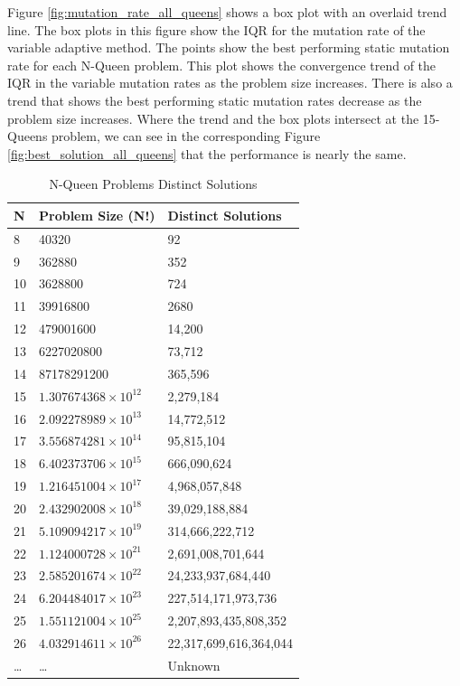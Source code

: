 \documentclass[conference]{IEEEtran}
\begin{document}
Figure \ref{fig:mutation_rate_all_queens} shows a box plot with an overlaid trend line. The box plots in this figure show the IQR for the mutation rate of the variable adaptive method. The points show the best performing static mutation rate for each N-Queen problem. This plot shows the convergence trend of the IQR in the variable mutation rates as the problem size increases. There is also a trend that shows the best performing static mutation rates decrease as the problem size increases. Where the trend and the box plots intersect at the 15-Queens problem, we can see in the corresponding Figure \ref{fig:best_solution_all_queens} that the performance is nearly the same.


% 
%
\begin{table}
\centering
\caption{N-Queen Problems Distinct Solutions}
\begin{tabular}{|l|l|l|} \hline
N  & Problem Size (N!)      & Distinct Solutions      \\ \hline
8  & 40320                      & 92                     \\
9  & 362880                     & 352                    \\
10 & 3628800                    & 724                    \\
11 & 39916800                   & 2680                   \\
12 & 479001600                  & 14,200                 \\
13 & 6227020800                 & 73,712                 \\
14 & 87178291200                & 365,596                \\
15 & $1.307674368\times10^{12}$ & 2,279,184              \\
16 & $2.092278989\times10^{13}$ & 14,772,512             \\
17 & $3.556874281\times10^{14}$ & 95,815,104             \\
18 & $6.402373706\times10^{15}$ & 666,090,624            \\
19 & $1.216451004\times10^{17}$ & 4,968,057,848          \\
20 & $2.432902008\times10^{18}$ & 39,029,188,884         \\
21 & $5.109094217\times10^{19}$ & 314,666,222,712        \\
22 & $1.124000728\times10^{21}$ & 2,691,008,701,644      \\
23 & $2.585201674\times10^{22}$ & 24,233,937,684,440     \\
24 & $6.204484017\times10^{23}$ & 227,514,171,973,736    \\
25 & $1.551121004\times10^{25}$ & 2,207,893,435,808,352  \\
26 & $4.032914611\times10^{26}$ & 22,317,699,616,364,044 \\
\dots & \dots & Unknown				\\
\hline\end{tabular}
\label{table:numuniquesol}
\end{table}
\end{document}
